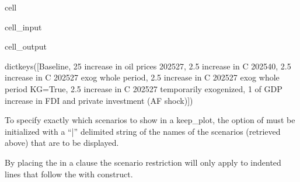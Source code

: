 \documentclass[letterpaper,10pt,english]{jupyterBook}
\begin{document}
\begin{sphinxuseclass}{cell}\begin{sphinxVerbatimInput}

\begin{sphinxuseclass}{cell_input}
\begin{sphinxVerbatim}[commandchars=\\\{\}]
\end{sphinxVerbatim}

\end{sphinxuseclass}\end{sphinxVerbatimInput}
\begin{sphinxVerbatimOutput}

\begin{sphinxuseclass}{cell_output}
\begin{sphinxVerbatim}[commandchars=\\\{\}]
dict\PYGZus{}keys([\PYGZsq{}Baseline\PYGZsq{}, \PYGZsq{}\PYGZdl{}25 increase in oil prices 2025\PYGZhy{}27\PYGZsq{}, \PYGZsq{}2.5\PYGZpc{} increase in C 2025\PYGZhy{}40\PYGZsq{}, \PYGZsq{}2.5\PYGZpc{} increase in C 2025\PYGZhy{}27 \PYGZhy{}\PYGZhy{} exog whole period\PYGZsq{}, \PYGZsq{}2.5\PYGZpc{} increase in C 2025\PYGZhy{}27 \PYGZhy{}\PYGZhy{} exog whole period \PYGZhy{}\PYGZhy{}KG=True\PYGZsq{}, \PYGZsq{}2.5\PYGZpc{} increase in C 2025\PYGZhy{}27 \PYGZhy{}\PYGZhy{} temporarily exogenized\PYGZsq{}, \PYGZsq{}1\PYGZpc{} of GDP increase in FDI and private investment (AF shock)\PYGZsq{}])
\end{sphinxVerbatim}

\end{sphinxuseclass}\end{sphinxVerbatimOutput}

\end{sphinxuseclass}
\sphinxAtStartPar
To specify exactly which scenarios to show in a keep\_plot, the  option of  must be initialized with a “|” delimited string of the names of the scenarios (retrieved above) that are to be displayed.

\sphinxAtStartPar
By placing the  in a  clause the scenario restriction will only apply to indented lines that follow the with construct.
\end{document}
